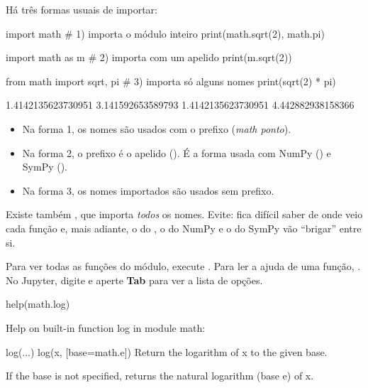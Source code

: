 Há três formas usuais de importar:

\begin{entrada}
import math                  # 1) importa o módulo inteiro
print(math.sqrt(2), math.pi)

import math as m             # 2) importa com um apelido
print(m.sqrt(2))

from math import sqrt, pi    # 3) importa só alguns nomes
print(sqrt(2) * pi)
\end{entrada}
\begin{saida}
1.4142135623730951 3.141592653589793
1.4142135623730951
4.442882938158366
\end{saida}

\begin{itemize}
  \item Na forma 1, os nomes são usados com o prefixo  (\emph{math ponto}).
  \item Na forma 2, o prefixo é o apelido (). É a forma usada com NumPy () e SymPy ().
  \item Na forma 3, os nomes importados são usados sem prefixo.
\end{itemize}

\begin{atencao}
Existe também , que importa \emph{todos} os nomes. Evite: fica difícil saber de onde veio
cada função e, mais adiante, o  do , o do NumPy e o do SymPy vão ``brigar'' entre si.
\end{atencao}

\begin{dica}
Para ver todas as funções do módulo, execute . Para ler a ajuda de uma função,
. No Jupyter, digite  e aperte \textbf{Tab} para ver a lista de opções.
\end{dica}

\begin{entrada}
help(math.log)
\end{entrada}
\begin{saida}
Help on built-in function log in module math:

log(...)
    log(x, [base=math.e])
    Return the logarithm of x to the given base.

    If the base is not specified, returns the natural logarithm (base e) of x.

\end{saida}

